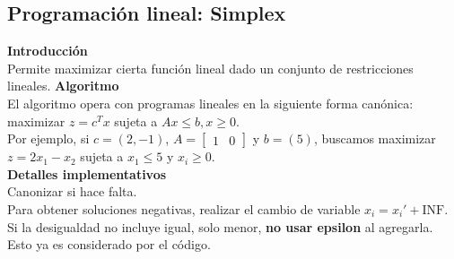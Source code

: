 {\begin{itemize}
\end{itemize}


\subsection{Programación lineal: Simplex}
\textbf{Introducción} \\
Permite maximizar cierta función lineal dado un conjunto de restricciones lineales.
\textbf{Algoritmo} \\
El algoritmo opera con programas lineales en la siguiente forma canónica: maximizar \(z = c^{T}x \) sujeta a \(Ax \leq b, x \geq 0\).  \\
Por ejemplo, si \(c=(2, -1)\), \(A=\begin{bmatrix} 1 & 0 \end{bmatrix}\) y \(b=(5)\), 
buscamos maximizar \(z = 2x_1 - x_2\) sujeta a \(x_1 \leq 5\) y \(x_i \geq 0\). \\
\textbf{Detalles implementativos} \\
Canonizar si hace falta.\\
Para obtener soluciones negativas, realizar el cambio de variable \(x_i = x_i' + \text{INF}\).\\
Si la desigualdad no incluye igual, solo menor, \textbf{no usar epsilon} al agregarla. Esto ya es considerado por el código.

}
